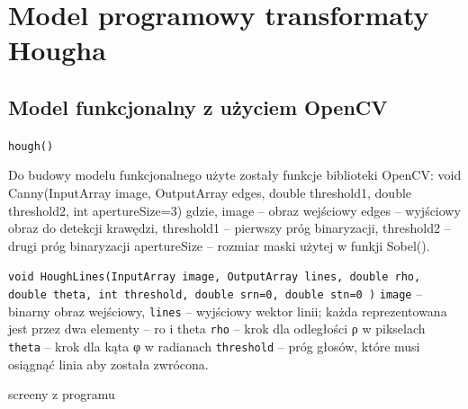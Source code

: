 \section{Model programowy transformaty Hougha}

\blindtext

\subsection{Model funkcjonalny z użyciem OpenCV}

\texttt{hough()}

Do budowy modelu funkcjonalnego użyte zostały funkcje biblioteki OpenCV:
void Canny(InputArray image, OutputArray edges, double threshold1, double threshold2, int apertureSize=3)
gdzie,
image – obraz wejściowy
edges – wyjściowy obraz do detekcji krawędzi,
threshold1 – pierwszy próg binaryzacji,
threshold2 – drugi próg binaryzacji
apertureSize – rozmiar maski użytej w funkji Sobel().

\texttt{void HoughLines(InputArray image, OutputArray lines, double rho, double theta, int threshold, double srn=0, double stn=0 )}
\texttt{image} – binarny obraz wejściowy,
\texttt{lines} – wyjściowy wektor linii; każda reprezentowana jest przez dwa elementy – ro i theta
\texttt{rho} – krok dla odległości ρ w pikselach
\texttt{theta} – krok dla kąta φ w radianach
\texttt{threshold} – próg głosów, które musi osiągnąć linia aby została zwrócona.


screeny z programu

